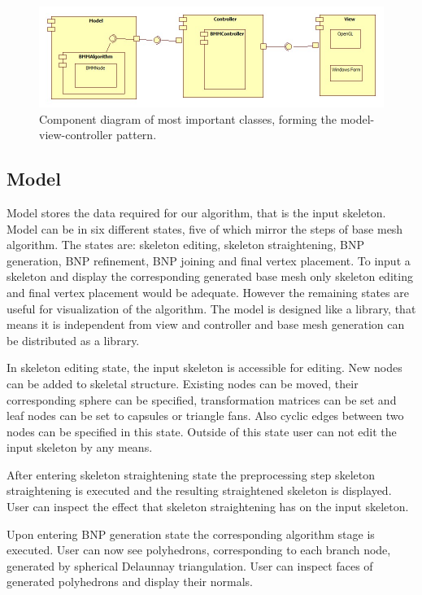 \begin{figure}[h]
    \centering
    \includegraphics[width=\textwidth]{images/classes}
    \caption[Component diagram of classes]{Component diagram of most important classes, forming the model-view-controller pattern.}
    \label{fig:classes}
\end{figure}

\subsection{Model}

Model stores the data required for our algorithm, that is the input skeleton.
Model can be in six different states, five of which mirror the steps of base mesh algorithm.
The states are: skeleton editing, skeleton straightening, BNP generation, BNP refinement, BNP joining and final vertex placement.
To input a skeleton and display the corresponding generated base mesh only skeleton editing and final vertex placement would be adequate.
However the remaining states are useful for visualization of the algorithm.
The model is designed like a library, that means it is independent from view and controller and base mesh generation can be distributed as a library.

In skeleton editing state, the input skeleton is accessible for editing.
New nodes can be added to skeletal structure.
Existing nodes can be moved, their corresponding sphere can be specified, transformation matrices can be set and leaf nodes can be set to capsules or triangle fans.
Also cyclic edges between two nodes can be specified in this state.
Outside of this state user can not edit the input skeleton by any means.

After entering skeleton straightening state the preprocessing step skeleton straightening is executed and the resulting straightened skeleton is displayed.
User can inspect the effect that skeleton straightening has on the input skeleton.

Upon entering BNP generation state the corresponding algorithm stage is executed.
User can now see polyhedrons, corresponding to each branch node, generated by spherical Delaunnay triangulation.
User can inspect faces of generated polyhedrons and display their normals.

